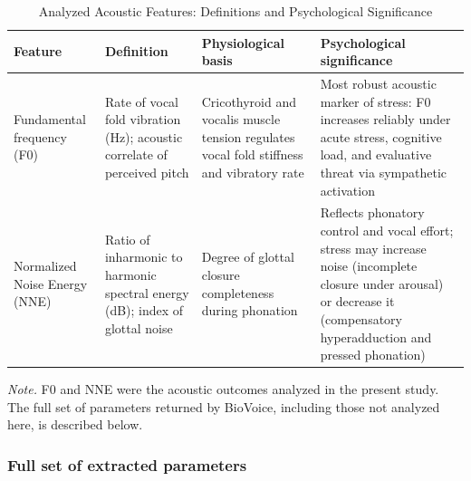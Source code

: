 \documentclass[
  english,
  man,floatsintext]{apa6}
\begin{document}
\begin{table}[p]
\centering
\caption{Analyzed Acoustic Features: Definitions and Psychological Significance}
\label{tab:acoustic-features}
\begin{threeparttable}
\scriptsize
\begin{tabular}{p{2.4cm} p{3.2cm} p{2.6cm} p{3.0cm}}
\hline
Feature & Definition & Physiological basis & Psychological significance \\
\hline
Fundamental frequency (F0) & Rate of vocal fold vibration (Hz); acoustic correlate of perceived pitch & 
Cricothyroid and vocalis muscle tension regulates vocal fold stiffness and vibratory rate & 
Most robust acoustic marker of stress: F0 increases reliably under acute stress, cognitive load, and evaluative threat via sympathetic activation \\[4pt]

Normalized Noise Energy (NNE) & Ratio of inharmonic to harmonic spectral energy (dB); index of glottal noise & 
Degree of glottal closure completeness during phonation & 
Reflects phonatory control and vocal effort; stress may increase noise (incomplete closure under arousal) or decrease it (compensatory hyperadduction and pressed phonation) \\[4pt]
\hline
\end{tabular}

\begin{tablenotes}
\footnotesize
\item \textit{Note.} F0 and NNE were the acoustic outcomes analyzed in the present study. The full set of parameters returned by BioVoice, including those not analyzed here, is described below.
\end{tablenotes}
\end{threeparttable}
\end{table}

\subsubsection{Full set of extracted parameters}\label{full-set-of-extracted-parameters}
\end{document}
